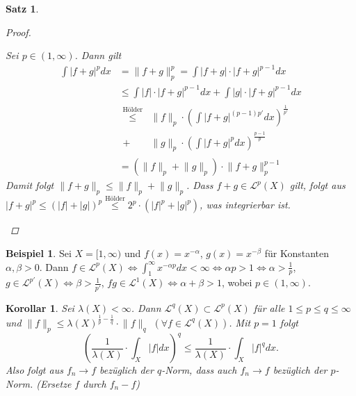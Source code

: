 \documentclass[a4paper]{scrreprt}
\newcommand{\Leb}{\mathcal{L}}
\newcommand{\jlabel}[1]{\label{j_#1}}
\theoremstyle{plain}
\newtheorem{satz}[thm]{Satz}
\newtheorem{kor}[thm]{Korollar}
\theoremstyle{definition}
\newtheorem{expl}[thm]{Beispiel}
\begin{document}
{{{{\begin{satz}
\begin{proof}
\begin{enumerate}
                Sei \uline{$p\in(1,\infty)$}. Dann gilt
                \[
                    \begin{split}
                        \int |f+g|^p dx &= \lVert f + g \rVert_p^p = \int |f+g| \cdot |f+g|^{p-1} dx\\
                                        &\le \int |f|\cdot |f+g|^{p-1} dx + \int |g| \cdot |f+g|^{p-1} dx\\
                                        &\begin{split}
                                            \overset{\text{Hölder}}{\le} &\lVert f \rVert_p \cdot \left(\int |f+g|^{(p-1)p'} dx \right)^\frac{1}{p'}\\
                                            + &\lVert g \rVert_p \cdot \left(\int |f+g|^p dx \right)^\frac{p-1}{p}
                                         \end{split}\\
                                        &= (\lVert f \rVert_p + \lVert g \rVert_p)\cdot \lVert f+g \rVert_p^{p-1} 
                    \end{split}
                \]
                Damit folgt $\lVert f+g \rVert_p \le \lVert f \rVert_p + \lVert g \rVert_p$. Dass $f+g \in \Leb^p(X)$ gilt, folgt aus $|f+g|^p \le (|f| + |g|)^p \overset{\text{{Hölder}}}{\le} 2^p\cdot (|f|^p + |g|^p)$, was integrierbar ist.
        \end{enumerate}
    \end{proof}
\end{satz}

\begin{expl}
    \jlabel{Bsp 5.2}
    Sei $X = [1,\infty)$ und $f(x) = x^{-\alpha}$, $g(x)=x^{-\beta}$ für Konstanten $\alpha, \beta >0$. Dann $f\in \Leb^p(X) \Leftrightarrow \int_1^\infty x^{-\alpha p} dx < \infty \Leftrightarrow \alpha p > 1 \Leftrightarrow \alpha > \frac{1}{p}$, $g\in \Leb^{p'}(X) \Leftrightarrow \beta > \frac{1}{p'}$, $fg \in \Leb^1(X) \Leftrightarrow \alpha + \beta > 1$, wobei $p \in (1,\infty)$.
\end{expl}


\begin{kor}
    \jlabel{Kor 5.3}
    Sei $\lambda(X) < \infty$. Dann $\Leb^q(X) \subset \Leb^p(X)$ für alle $1\le p \le q \le  \infty$ und $\lVert f \rVert_p \le \lambda(X)^{\frac{1}{p}-\frac{1}{q}}\cdot \lVert f \rVert_q$ $(\forall f \in \Leb^q(X))$. Mit $p=1$ folgt
    \[
        \left(\frac{1}{\lambda(X)} \cdot \int_X |f|dx \right)^q \le \frac{1}{\lambda(X)}\cdot \int_X |f|^q dx.
    \]
    Also folgt aus $f_n \to f$ bezüglich der $q$-Norm, dass auch $f_n \to f$ bezüglich der $p$-Norm. (Ersetze $f$ durch $f_n-f$)
    

\end{kor}}}}}
\end{document}
